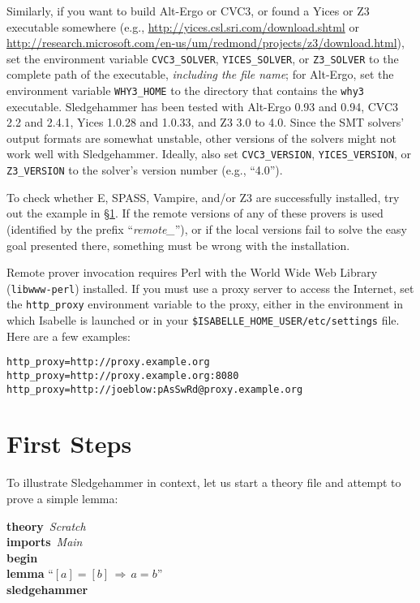 \documentclass[a4paper,12pt]{article}
\begin{document}
\begin{sloppy}
\begin{enum}
Similarly, if you want to build Alt-Ergo or CVC3, or found a
Yices or Z3 executable somewhere (e.g.,
\url{http://yices.csl.sri.com/download.shtml} or
\url{http://research.microsoft.com/en-us/um/redmond/projects/z3/download.html}),
set the environment variable \texttt{CVC3\_\allowbreak SOLVER},
\texttt{YICES\_SOLVER}, or \texttt{Z3\_SOLVER} to the complete path of
the executable, \emph{including the file name};
for Alt-Ergo, set the
environment variable \texttt{WHY3\_HOME} to the directory that contains the
\texttt{why3} executable.
Sledgehammer has been tested with Alt-Ergo 0.93 and 0.94, CVC3 2.2 and 2.4.1,
Yices 1.0.28 and 1.0.33, and Z3 3.0 to 4.0. Since the SMT solvers' output
formats are somewhat unstable, other versions of the solvers might not work well
with Sledgehammer. Ideally, also set \texttt{CVC3\_VERSION},
\texttt{YICES\_VERSION}, or \texttt{Z3\_VERSION} to the solver's version number
(e.g., ``4.0'').
\end{enum}
\end{sloppy}

To check whether E, SPASS, Vampire, and/or Z3 are successfully installed, try
out the example in \S\ref{first-steps}. If the remote versions of any of these
provers is used (identified by the prefix ``\emph{remote\_\/}''), or if the
local versions fail to solve the easy goal presented there, something must be
wrong with the installation.

Remote prover invocation requires Perl with the World Wide Web Library
(\texttt{libwww-perl}) installed. If you must use a proxy server to access the
Internet, set the \texttt{http\_proxy} environment variable to the proxy, either
in the environment in which Isabelle is launched or in your
\texttt{\$ISABELLE\_HOME\_USER/etc/settings} file. Here are a few
examples:

\prew
\texttt{http\_proxy=http://proxy.example.org} \\
\texttt{http\_proxy=http://proxy.example.org:8080} \\
\texttt{http\_proxy=http://joeblow:pAsSwRd@proxy.example.org}
\postw

\section{First Steps}
\label{first-steps}

To illustrate Sledgehammer in context, let us start a theory file and
attempt to prove a simple lemma:

\prew
\textbf{theory}~\textit{Scratch} \\
\textbf{imports}~\textit{Main} \\
\textbf{begin} \\[2\smallskipamount]
%
\textbf{lemma} ``$[a] = [b] \,\Longrightarrow\, a = b$'' \\
\textbf{sledgehammer}
\postw
\end{document}
